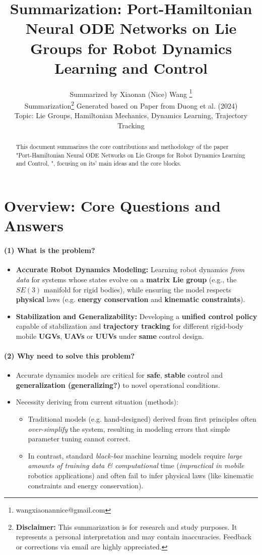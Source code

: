 \documentclass{article}
\title{Summarization: Port-Hamiltonian Neural ODE Networks on Lie Groups for Robot Dynamics Learning and Control}
\author{
  Summarized by Xiaonan (Nice) Wang \thanks{wangxiaonannice@gmail.com} \\
  Summarization\thanks{\textbf{Disclaimer:} This summarization is for research and study purposes. It represents a personal interpretation and may contain inaccuracies. Feedback or corrections via email are highly appreciated.} Generated based on Paper from Duong et al. (2024) \\
  Topic: Lie Groups, Hamiltonian Mechanics, Dynamics Learning, Trajectory Tracking \\
}
\begin{document}
\newcommand{\repeatfootnote}[1]{\textsuperscript{\ref{#1}}}

\maketitle

\begin{abstract}
This document summarizes the core contributions and methodology of the paper "Port-Hamiltonian Neural ODE Networks on Lie Groups for Robot Dynamics Learning and Control, \cite{duong2024port}", focusing on its' main ideas and the core blocks.
\end{abstract}

\section{Overview: Core Questions and Answers}
                           
\paragraph{(1) What is the problem?} 
\begin{itemize}
  \item \textbf{Accurate Robot Dynamics Modeling:} Learning robot dynamics \textit{from data} for systems whose states evolve on a \textbf{matrix Lie group} (e.g., the $SE(3)$ manifold for rigid bodies), while ensuring the model respects \textbf{physical} laws (e.g. \textbf{energy conservation} and \textbf{kinematic constraints}).
  \item \textbf{Stabilization and Generalizability:} Developing a \textbf{unified control policy} capable of stabilization and \textbf{trajectory tracking} for different rigid-body mobile \textbf{UGVs}, \textbf{UAVs} or \textbf{UUVs} under \textbf{same} control design.
\end{itemize}

\paragraph{(2) Why need to solve this problem?}
\begin{itemize}
  \item Accurate dynamics models are critical for \textbf{safe}, \textbf{stable} control and \textbf{generalization (generalizing?)} to novel operational conditions.
  \item Necessity deriving from current situation (methods):
  \begin{itemize}
    \item Traditional models (e.g. hand-designed) derived from first principles often \textit{over-simplify} the system, resulting in modeling errors that simple parameter tuning cannot correct.
    \item In contrast, standard \textit{black-box} machine learning models require \textit{large amounts of training data \& computational} time (\textit{impractical in mobile} robotics applications) and often fail to infer physical laws (like kinematic constraints and energy conservation).
  \end{itemize}
\end{itemize}
\end{document}
